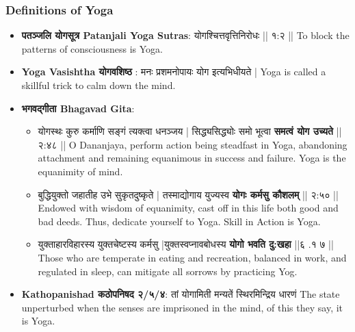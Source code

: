 \begin{frame}[fragile]\frametitle{Definitions of Yoga}
      \begin{itemize}
        \item \textbf{पतञ्जलि  योगसूत्र  Patanjali Yoga Sutras}:      योगश्चित्तवृत्तिनिरोधः || १:२ || To block the patterns of consciousness is Yoga.
        \item \textbf{Yoga Vasishtha योगवशिष्ठ }:          मनः प्रशमनोपायः योग इत्यभिधीयते | Yoga is called a skillful trick to calm down the mind.
        \item \textbf{भगवद्गीता  Bhagavad Gita}:         
		      \begin{itemize}
				\item  योगस्थः कुरु कर्माणि सङ्गं त्यक्त्वा धनञ्जय |   सिद्ध्यसिद्ध्योः समो भूत्वा \textbf{समत्वं योग उच्यते }|| २:४८ || O Dananjaya, perform action being steadfast in Yoga, abandoning attachment and remaining equanimous in success and failure. Yoga is the equanimity of mind.
				\item बुद्धियुक्तो जहातीह उभे सुकृतदुष्कृते |      तस्माद्योगाय युज्यस्व \textbf{योगः कर्मसु कौशलम् }|| २:५० || Endowed with wisdom of equanimity, cast off in this life both good and bad deeds. Thus, dedicate yourself to Yoga. Skill in Action is Yoga.
				\item युक्ताहारविहारस्य युक्तचेष्टस्य कर्मसु |युक्तस्वप्नावबोधस्य \textbf{योगो भवति दु:खहा }||६ .१ ७ || Those who are temperate in eating and recreation, balanced in work, and regulated in sleep, can mitigate all sorrows by practicing Yog.
				\end{itemize}
		\item \textbf{Kathopanishad कठोपनिषद २/५/४}: तां योगामिती मन्यतें स्थिरमिन्द्रिय धारणं The state unperturbed when the senses are imprisoned in the mind, of this they say, it is Yoga.
      \end{itemize}
\end{frame}




